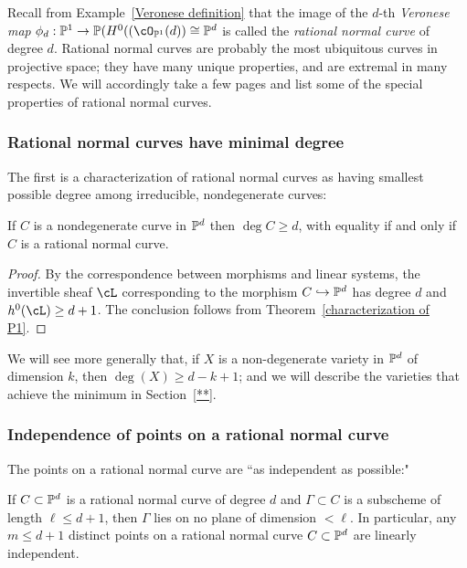 Recall from Example~\ref{Veronese definition} that the image of the $d$-th \emph{Veronese map}  $\phi_d: \PP^1 \to \PP(H^0((\cO_{\PP^1}(d)) \cong \PP^d$ is called the \emph{rational normal curve} of degree $d$. Rational normal curves are probably the most ubiquitous curves in projective space; they have many unique properties, and are extremal in many respects. We will accordingly take a few pages and list some of the special properties of rational normal curves.

\subsubsection{Rational normal curves have minimal degree}
The first is a characterization of rational normal curves as having smallest possible degree among irreducible, nondegenerate curves:

\begin{proposition}
If $C$ is a nondegenerate curve in $\PP^d$ then $\deg C \geq d$, with equality if and only if $C$ is a  rational normal curve.
\end{proposition}

\begin{proof}
 By the correspondence between morphisms and linear systems, the invertible sheaf $\cL$ corresponding to the morphism $C \hookrightarrow \PP^d$ has degree $d$ and
 $h^0(\cL) \geq d+1$. The conclusion follows from Theorem~\ref{characterization of P1}.
\end{proof}

We will see more generally that, if $X$ is a non-degenerate variety in $\PP^d$ of dimension $k$, then $\deg(X) \geq d-k+1$; and we will describe the varieties that achieve the minimum in Section~\ref{**}.

\subsubsection{Independence of points on a rational normal curve}

The points on a rational normal curve are ``as independent as possible:"

\begin{proposition}\label{independence on rnc}
If $C\subset \PP^d$ is a rational normal curve of degree $d$ and $\Gamma\subset C$ is a subscheme of length $\ell \leq d+1$, then
$\Gamma$ lies on no plane of dimension $<\ell$. In particular, any $m \leq d+1$ distinct points on a rational normal curve $C \subset \PP^d$ are linearly independent.
\end{proposition}

